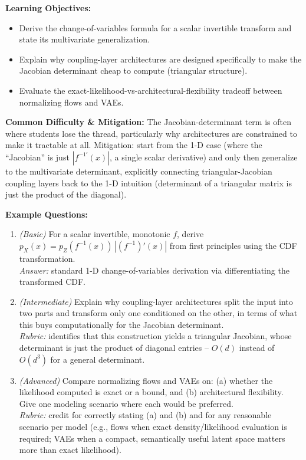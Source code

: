 \documentclass[11pt]{article}
\begin{document}
\textbf{Learning Objectives:}
\begin{itemize}
  \item Derive the change-of-variables formula for a scalar invertible transform and state its multivariate generalization.
  \item Explain why coupling-layer architectures are designed specifically to make the Jacobian determinant cheap to compute (triangular structure).
  \item Evaluate the exact-likelihood-vs-architectural-flexibility tradeoff between normalizing flows and VAEs.
\end{itemize}

\textbf{Common Difficulty \& Mitigation:} The Jacobian-determinant term is often where students lose the thread, particularly why architectures are constrained to make it tractable at all. Mitigation: start from the 1-D case (where the ``Jacobian'' is just $|f^{-1\prime}(x)|$, a single scalar derivative) and only then generalize to the multivariate determinant, explicitly connecting triangular-Jacobian coupling layers back to the 1-D intuition (determinant of a triangular matrix is just the product of the diagonal).

\textbf{Example Questions:}
\begin{enumerate}
  \item \textit{(Basic)} For a scalar invertible, monotonic $f$, derive $p_X(x) = p_Z(f^{-1}(x))\,|(f^{-1})'(x)|$ from first principles using the CDF transformation. \\
  \textit{Answer:} standard 1-D change-of-variables derivation via differentiating the transformed CDF.
  \item \textit{(Intermediate)} Explain why coupling-layer architectures split the input into two parts and transform only one conditioned on the other, in terms of what this buys computationally for the Jacobian determinant. \\
  \textit{Rubric:} identifies that this construction yields a triangular Jacobian, whose determinant is just the product of diagonal entries -- $O(d)$ instead of $O(d^3)$ for a general determinant.
  \item \textit{(Advanced)} Compare normalizing flows and VAEs on: (a) whether the likelihood computed is exact or a bound, and (b) architectural flexibility. Give one modeling scenario where each would be preferred. \\
  \textit{Rubric:} credit for correctly stating (a) and (b) and for any reasonable scenario per model (e.g., flows when exact density/likelihood evaluation is required; VAEs when a compact, semantically useful latent space matters more than exact likelihood).
\end{enumerate}
\end{document}
